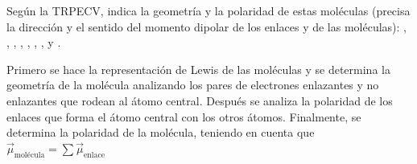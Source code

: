 \begin{exercise}
    Según la TRPECV, indica la geometría y la polaridad de
    estas moléculas (precisa la dirección y el sentido del momento
    dipolar de los enlaces y de las moléculas): ,
    , , , , , ,  y .

    \begin{solu}

        Primero se hace la representación de Lewis de las moléculas
        y se determina la geometría de la molécula analizando los
        pares de electrones enlazantes y no enlazantes que rodean al
        átomo central. Después se analiza la polaridad de los enlaces
        que forma el átomo central con los otros átomos. Finalmente,
        se determina la polaridad de la molécula, teniendo en cuenta
        que \(\vec{\mu}_{\text{molécula}} = \sum \vec{\mu}_{\text{enlace}} \)

%
%
%


\end{solu}
\end{exercise}
